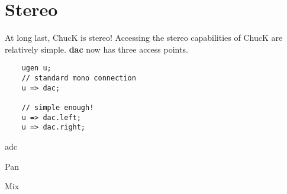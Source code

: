 \section{Stereo}

At long last, ChucK is stereo! Accessing the stereo capabilities of ChucK are relatively simple. {\bf dac} now has three access points. 

\begin{verbatim}
    ugen u;
    // standard mono connection
    u => dac;

    // simple enough!
    u => dac.left;
    u => dac.right;
\end{verbatim}

adc

Pan

Mix